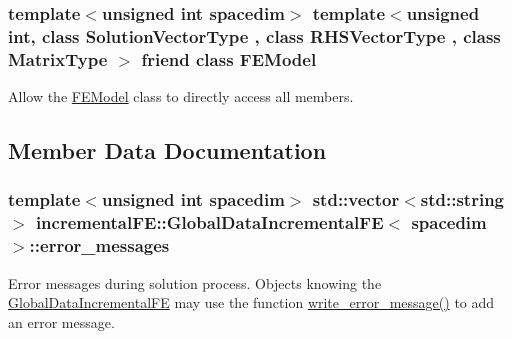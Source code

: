 \subsubsection[{\texorpdfstring{F\+E\+Model}{FEModel}}]{\setlength{\rightskip}{0pt plus 5cm}template$<$unsigned int spacedim$>$ template$<$unsigned int, class Solution\+Vector\+Type , class R\+H\+S\+Vector\+Type , class Matrix\+Type $>$ friend class {\bf F\+E\+Model}\hspace{0.3cm}{\ttfamily [friend]}}\hypertarget{classincremental_f_e_1_1_global_data_incremental_f_e_a19042fe49657aad3a64c2a04565a12d8}{}\label{classincremental_f_e_1_1_global_data_incremental_f_e_a19042fe49657aad3a64c2a04565a12d8}
Allow the \hyperlink{classincremental_f_e_1_1_f_e_model}{F\+E\+Model} class to directly access all members. 

\subsection{Member Data Documentation}
\subsubsection[{\texorpdfstring{error\+\_\+messages}{error_messages}}]{\setlength{\rightskip}{0pt plus 5cm}template$<$unsigned int spacedim$>$ std\+::vector$<$std\+::string$>$ {\bf incremental\+F\+E\+::\+Global\+Data\+Incremental\+FE}$<$ spacedim $>$\+::error\+\_\+messages\hspace{0.3cm}{\ttfamily [private]}}\hypertarget{classincremental_f_e_1_1_global_data_incremental_f_e_a47301f72bcb3852b2519b23de833f3eb}{}\label{classincremental_f_e_1_1_global_data_incremental_f_e_a47301f72bcb3852b2519b23de833f3eb}
Error messages during solution process. Objects knowing the \hyperlink{classincremental_f_e_1_1_global_data_incremental_f_e}{Global\+Data\+Incremental\+FE} may use the function \hyperlink{classincremental_f_e_1_1_global_data_incremental_f_e_a9845e6a20c93b8aec769238ac23106da}{write\+\_\+error\+\_\+message()} to add an error message. 
